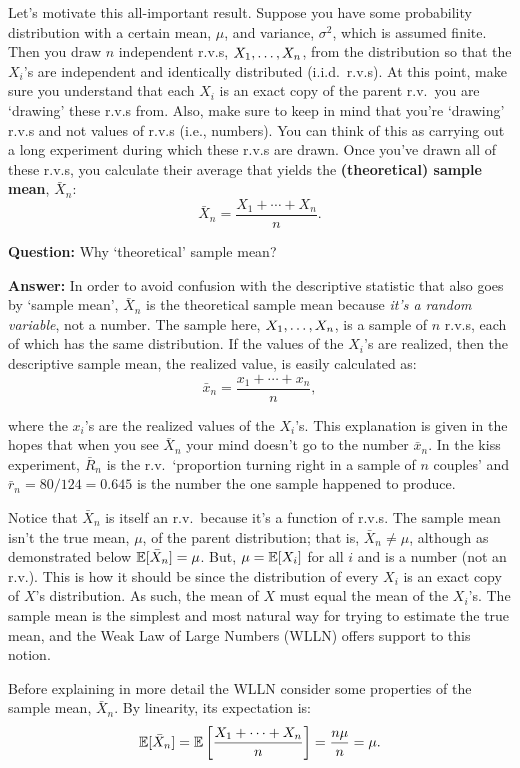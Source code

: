 Let's motivate this all-important result.
Suppose you have some probability distribution with a certain mean, $\mu$, and variance, $\sigma^2$, which is assumed finite.
Then you draw $n$ independent r.v.s, $X_1, \ldots, X_n$, from the distribution so that the $X_i$'s are independent and identically distributed (i.i.d.\ r.v.s).
At this point, make sure you understand that each $X_i$ is an exact copy of the parent r.v.\ you are `drawing' these r.v.s from.
Also, make sure to keep in mind that you're `drawing' r.v.s and not values of r.v.s (i.e., numbers).
You can think of this as carrying out a long experiment during which these r.v.s are drawn.
Once you've drawn all of these r.v.s, you calculate their average that yields the \textbf{(theoretical) sample mean}, $\bar{X}_n$:
\[
\bar{X}_n = \frac{X_1 + \cdots + X_n}{n}.
\]

\textbf{Question:} Why `theoretical' sample mean?

\textbf{Answer:} In order to avoid confusion with the descriptive statistic that also goes by `sample mean', $\bar{X}_n$ is the theoretical sample mean because \textit{it's a random variable}, not a number.
The sample here, $X_1, \ldots, X_n$, is a sample of $n$ r.v.s, each of which has the same distribution.
If the values of the $X_i$'s are realized, then the descriptive sample mean, the realized value, is easily calculated as:
\[
\bar{x}_n = \frac{x_1 + \cdots + x_n}{n},
\]

where the $x_i$'s are the realized values of the $X_i$'s.
This explanation is given in the hopes that when you see $\bar{X}_n$ your mind doesn't go to the number $\bar{x}_n$.
In the kiss experiment, $\bar{R}_n$ is the r.v.\ `proportion turning right in a sample of $n$ couples' and $\bar{r}_n = 80/124 = 0.645$ is the number the one sample happened to produce.

Notice that $\bar{X}_n$ is itself an r.v.\ because it's a function of r.v.s.
The sample mean isn't the true mean, $\mu$, of the parent distribution; that is, $\bar{X}_n \neq \mu$, although as demonstrated below $\operatorname*{\mathbb{E}}[\bar{X}_n] = \mu$.
But, $\mu = \operatorname*{\mathbb{E}}[X_i]$ for all $i$ and is a number (not an r.v.).
This is how it should be since the distribution of every $X_i$ is an exact copy of $X$'s distribution.
As such, the mean of $X$ must equal the mean of the $X_i$'s.
The sample mean is the simplest and most natural way for trying to estimate the true mean, and the Weak Law of Large Numbers (WLLN) offers support to this notion.

Before explaining in more detail the WLLN consider some properties of the sample mean, $\bar{X}_n$.
By linearity, its expectation is:
\[
\operatorname*{\mathbb{E}}[\bar{X}_n] = \operatorname*{\mathbb{E}}\left[\frac{X_1 + \cdots + X_n}{n} \right] = \frac{n \mu}{n} = \mu.
\]

